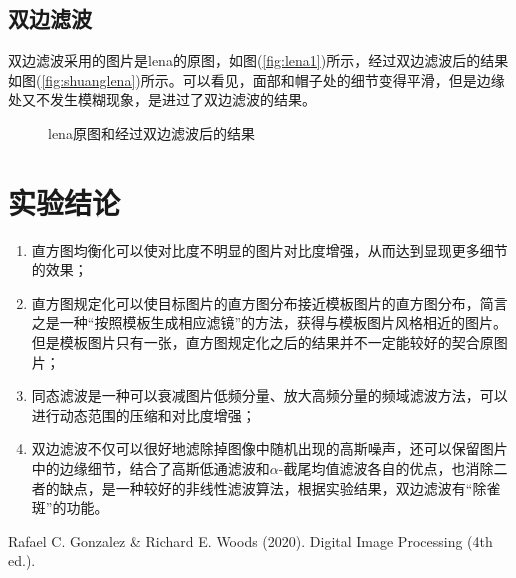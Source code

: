 \documentclass{hitreport}
\begin{document}
\subsection{双边滤波}

双边滤波采用的图片是lena的原图，如图(\ref{fig:lena1})所示，经过双边滤波后的结果如图(\ref{fig:shuanglena})所示。可以看见，面部和帽子处的细节变得平滑，但是边缘处又不发生模糊现象，是进过了双边滤波的结果。

\begin{figure}[htb]
	\centering
	\hspace{20pt}
	\caption{lena原图和经过双边滤波后的结果}\label{fig:shuang}
\end{figure}



\section{实验结论}

\begin{enumerate}
\item 直方图均衡化可以使对比度不明显的图片对比度增强，从而达到显现更多细节的效果；
\item 直方图规定化可以使目标图片的直方图分布接近模板图片的直方图分布，简言之是一种“按照模板生成相应滤镜”的方法，获得与模板图片风格相近的图片。但是模板图片只有一张，直方图规定化之后的结果并不一定能较好的契合原图片；
\item 同态滤波是一种可以衰减图片低频分量、放大高频分量的频域滤波方法，可以进行动态范围的压缩和对比度增强；
\item 双边滤波不仅可以很好地滤除掉图像中随机出现的高斯噪声，还可以保留图片中的边缘细节，结合了高斯低通滤波和$\alpha$-截尾均值滤波各自的优点，也消除二者的缺点，是一种较好的非线性滤波算法，根据实验结果，双边滤波有“除雀斑”的功能。
\end{enumerate}

\renewcommand\refname{参考文献}
 
\begin{thebibliography}{1}
Rafael C. Gonzalez \& Richard E. Woods (2020). Digital Image Processing (4th ed.).

\end{thebibliography}
\end{document}
